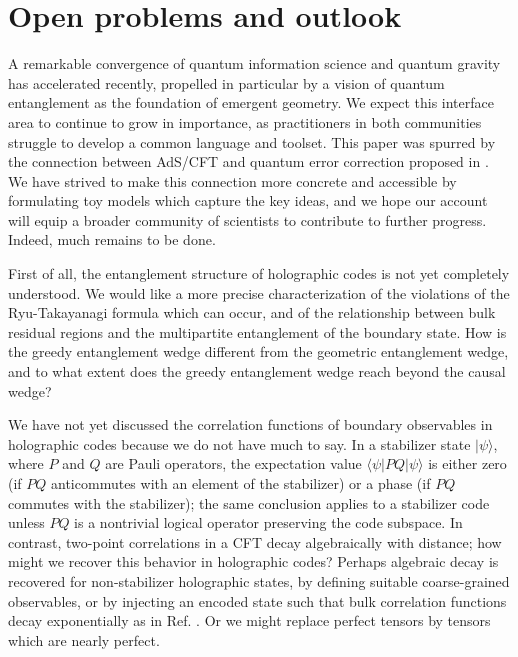 \documentclass[12pt]{article}
\theoremstyle{plain}
\theoremstyle{plain}
\theoremstyle{plain}
\theoremstyle{plain}
\theoremstyle{result}
\theoremstyle{remark}
\theoremstyle{conjecture}
\theoremstyle{observation}
\theoremstyle{definition}
\theoremstyle{corollary}
\theoremstyle{definition}
\theoremstyle{definition}
\theoremstyle{assumption}
\theoremstyle{definition}
\theoremstyle{problem}
\theoremstyle{fact}
\begin{document}
\section{Open problems and outlook}\label{sec:conclude}

A remarkable convergence of quantum information science and quantum gravity has accelerated recently, propelled in particular by a vision of quantum entanglement as the foundation of emergent geometry. We expect this interface area to continue to grow in importance, as practitioners in both communities struggle to develop a common language and toolset. This paper was spurred by the connection between AdS/CFT and quantum error correction proposed in \cite{Almheiri14}. We have strived to make this connection more concrete and accessible  by formulating toy models which capture the key ideas, and we hope our account will equip a broader community of scientists to contribute to further progress. Indeed, much remains to be done. 

First of all, the entanglement structure of holographic codes is not yet completely understood. We would like a more precise characterization of the violations of the Ryu-Takayanagi formula which can occur, and of the relationship between bulk residual regions and the multipartite entanglement of the boundary state. How is the greedy entanglement wedge different from the geometric entanglement wedge, and to what extent does the greedy entanglement wedge reach beyond the causal wedge?

We have not yet discussed the correlation functions of boundary observables in holographic codes because we do not have much to say. 
In a stabilizer state $|\psi\rangle$, where $P$ and $Q$ are Pauli operators, the expectation value $\langle \psi| PQ|\psi\rangle$ is either zero (if $PQ$ anticommutes with an element of the stabilizer) or a phase (if $PQ$ commutes with the stabilizer); the same conclusion applies to a stabilizer code unless $PQ$ is a nontrivial logical operator preserving the code subspace.
In contrast, two-point correlations in a CFT decay algebraically with distance; how might we recover this behavior in holographic codes? 
Perhaps algebraic decay is recovered for non-stabilizer holographic states, by defining suitable coarse-grained observables, or by injecting an encoded state such that bulk correlation functions decay exponentially as in Ref. \cite{Qi13}. 
Or we might replace perfect tensors by tensors which are nearly perfect.
\end{document}
